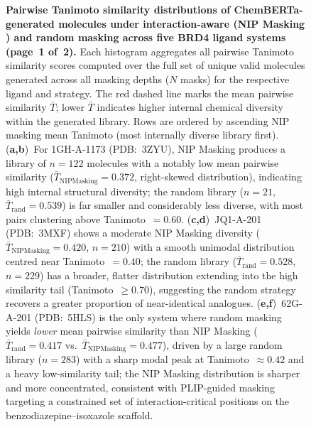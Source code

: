 \documentclass[a4paper,12pt]{article}
\begin{document}
\begin{figure}[p]
    \caption{%
        \textbf{Pairwise Tanimoto similarity distributions of
        ChemBERTa-generated molecules under interaction-aware (NIP Masking )
        and random masking across five BRD4 ligand systems
        (page~1 of~2).}
        Each histogram aggregates all pairwise Tanimoto similarity
        scores computed over the full set of unique valid molecules
        generated across all masking depths ($N$ masks) for the
        respective ligand and strategy.
        The red dashed line marks the mean pairwise similarity
        $\bar{T}$; lower $\bar{T}$ indicates higher internal
        chemical diversity within the generated library.
        Rows are ordered by ascending NIP masking mean Tanimoto (most
        internally diverse library first).
        (\textbf{a,b})~For 1GH-A-1173 (PDB:~3ZYU), NIP Masking produces a
        library of $n = 122$ molecules with a notably low mean
        pairwise similarity ($\bar{T}_{\mathrm{NIP Masking }} = 0.372$,
        right-skewed distribution), indicating high internal
        structural diversity; the random library ($n = 21$,
        $\bar{T}_{\mathrm{rand}} = 0.539$) is far smaller and
        considerably less diverse, with most pairs clustering
        above Tanimoto~$= 0.60$.
        (\textbf{c,d})~JQ1-A-201 (PDB:~3MXF) shows a moderate NIP Masking
        diversity ($\bar{T}_{\mathrm{NIP Masking}} = 0.420$, $n = 210$)
        with a smooth unimodal distribution centred near
        Tanimoto~$= 0.40$; the random library
        ($\bar{T}_{\mathrm{rand}} = 0.528$, $n = 229$) has a
        broader, flatter distribution extending into the high
        similarity tail (Tanimoto~$\geq 0.70$), suggesting the
        random strategy recovers a greater proportion of
        near-identical analogues.
        (\textbf{e,f})~62G-A-201 (PDB:~5HLS) is the only system
        where random masking yields \emph{lower} mean pairwise
        similarity than NIP Masking
        ($\bar{T}_{\mathrm{rand}} = 0.417$ vs.\
        $\bar{T}_{\mathrm{NIP Masking}} = 0.477$), driven by a large random
        library ($n = 283$) with a sharp modal peak at
        Tanimoto~$\approx 0.42$ and a heavy low-similarity tail;
        the NIP Masking distribution is sharper and more concentrated,
        consistent with PLIP-guided masking targeting a
        constrained set of interaction-critical positions on the
        benzodiazepine--isoxazole scaffold.
    }
    \label{fig:pairwise_tanimoto}
\end{figure}
 
\end{document}
